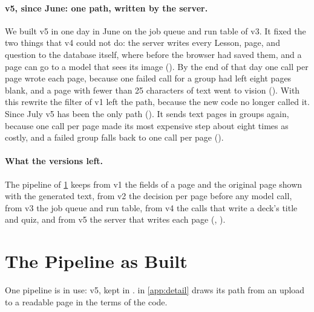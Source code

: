 \paragraph{v5, since June: one path, written by the server.}
We built v5 in one day in June on the job queue and run table of v3. It fixed
the two things that v4 could not do: the server writes every Lesson, page, and
question to the database itself, where before the browser had saved them, and
a page can go to a model that sees its image (). By the end of
that day one call per page wrote each page, because one failed call for a
group had left eight pages blank, and a page with fewer than 25 characters of
text went to vision (). With this rewrite the filter of v1 left
the path, because the new code no longer called it. Since July v5 has been the
only path (). It sends text pages in groups again, because one
call per page made its most expensive step about eight times as costly, and a
failed group falls back to one call per page ().

\paragraph{What the versions left.}
The pipeline of \cref{sec:pipeline} keeps from v1 the fields of a page and the
original page shown with the generated text, from v2 the decision per page
before any model call, from v3 the job queue and run table, from v4 the calls
that write a deck's title and quiz, and from v5 the server that writes each
page (, ).

\section{The Pipeline as Built}
\label{sec:pipeline}

One pipeline is in use: v5, kept in
.
 in \cref{app:detail} draws its path from an upload to a
readable page in the terms of the code.

